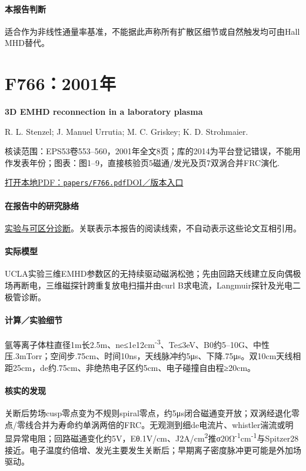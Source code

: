 \documentclass[UTF8,a4paper,11pt,openany,fontset=fandol]{ctexbook}
\begin{document}
\paragraph{本报告判断}适合作为非线性通量率基准，不能据此声称所有扩散区细节或自然触发均可由Hall MHD替代。

\section{F766：2001年}\label{paper:F766}

\textbf{3D EMHD reconnection in a laboratory plasma}\citep{F766}\

R. L. Stenzel;  J. Manuel Urrutia;  M. C. Griskey;  K. D. Strohmaier.

\textsf{核读范围：}EPS53卷553–560，2001年全文8页；库的2014为平台登记错误，不能用作发表年份；\textsf{图表：}图1–9，直接核验页5磁通/发光及页7双涡合并FRC演化.

\href{run:../papers/F766.pdf}{打开本地PDF：\texttt{papers/F766.pdf}}\quad\href{https://doi.org/10.1186/bf03353269}{DOI／版本入口}

\paragraph{在报告中的研究脉络}\hyperref[story:diagnostic]{实验与可区分诊断}。关联表示本报告的阅读线索，不自动表示这些论文互相引用。

\paragraph{实际模型}UCLA实验三维EMHD参数区的无持续驱动磁涡松弛；先由回路天线建立反向偶极场再断电，三维磁探针跨重复放电扫描并由curl B求电流，Langmuir探针及光电二极管诊断。

\paragraph{计算／实验细节}氩等离子体柱直径1m长2.5m、ne≤1e12cm\textsuperscript{-3}、Te≤3eV、B0约5–10G、中性压.3mTorr；空间步.75cm、时间10ns，天线脉冲约5μs、下降.75μs。双10cm天线相距25cm，de约.75cm、非绝热电子区约5cm、电子碰撞自由程≥20cm。

\paragraph{核实的发现}关断后势场cusp零点变为不规则spiral零点，约5μs闭合磁通变开放；双涡经退化零点/零线合并为寿命约单涡两倍的FRC。无观测到细de电流片、whistler湍流或明显异常电阻；回路磁通变化约5V，Eθ.1V/cm、J2A/cm\textsuperscript{2}推σ20Ω\textsuperscript{-1}cm\textsuperscript{-1}与Spitzer28接近。电子温度约倍增、发光主要发生关断后；早期离子密度脉冲更可能是外加场驱动。
\end{document}
